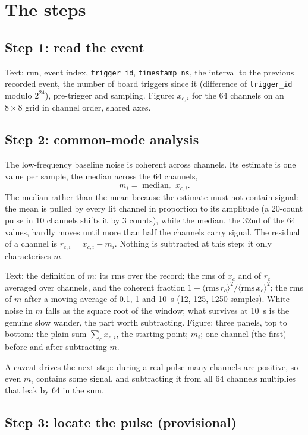 \documentclass[11pt]{article}
\newcommand{\code}[1]{\texttt{#1}}
\newcommand{\us}{\textmu s}
\begin{document}
\section{The steps}

\subsection{Step 1: read the event}

Text: run, event index, \code{trigger\_id}, \code{timestamp\_ns}, the
interval to the previous recorded event, the number of board triggers since
it (difference of \code{trigger\_id} modulo $2^{24}$), pre-trigger and
sampling. Figure: $x_{c,i}$ for the 64 channels on an $8\times8$ grid in
channel order, shared axes.

\subsection{Step 2: common-mode analysis}
\label{sec:cm}

The low-frequency baseline noise is coherent across channels. Its estimate
is one value per sample, the median across the 64 channels,
\[
  m_i = \operatorname{median}_c\, x_{c,i}.
\]
The median rather than the mean because the estimate must not contain
signal: the mean is pulled by every lit channel in proportion to its
amplitude (a 20-count pulse in 10 channels shifts it by 3 counts), while
the median, the 32nd of the 64 values, hardly moves until more than half
the channels carry signal. The residual of a channel is $r_{c,i} = x_{c,i}
- m_i$. Nothing is subtracted at this step; it only characterises $m$.

Text: the definition of $m$; its rms over the record; the rms of $x_c$
and of $r_c$ averaged over channels, and the coherent fraction $1 -
\langle\mathrm{rms}\,r_c\rangle^2 / \langle\mathrm{rms}\,x_c\rangle^2$;
the rms of $m$ after a moving average of 0.1, 1 and 10~\us{} (12, 125,
1250 samples). White noise in $m$ falls as the square root of the window;
what survives at 10~\us{} is the genuine slow wander, the part worth
subtracting. Figure: three panels, top to bottom: the plain sum $\sum_c
x_{c,i}$, the starting point; $m_i$; one channel (the first) before and
after subtracting $m$.

A caveat drives the next step: during a real pulse many channels are
positive, so even $m_i$ contains some signal, and subtracting it from all
64 channels multiplies that leak by 64 in the sum.

\subsection{Step 3: locate the pulse (provisional)}
\end{document}
